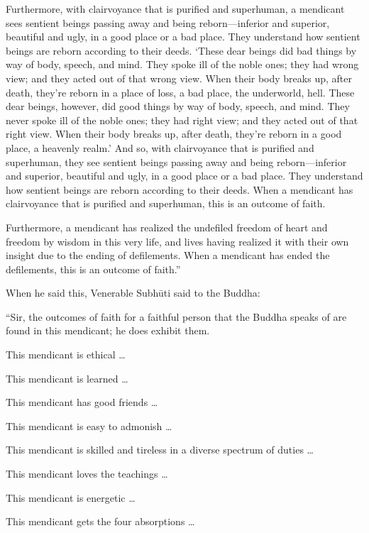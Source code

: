 \documentclass[12pt,openany]{book}%
\begin{document}
Furthermore, with clairvoyance that is purified and superhuman, a mendicant sees sentient beings passing away and being reborn—inferior and superior, beautiful and ugly, in a good place or a bad place. They understand how sentient beings are reborn according to their deeds. ‘These dear beings did bad things by way of body, speech, and mind. They spoke ill of the noble ones; they had wrong view; and they acted out of that wrong view. When their body breaks up, after death, they’re reborn in a place of loss, a bad place, the underworld, hell. These dear beings, however, did good things by way of body, speech, and mind. They never spoke ill of the noble ones; they had right view; and they acted out of that right view. When their body breaks up, after death, they’re reborn in a good place, a heavenly realm.’ And so, with clairvoyance that is purified and superhuman, they see sentient beings passing away and being reborn—inferior and superior, beautiful and ugly, in a good place or a bad place. They understand how sentient beings are reborn according to their deeds. When a mendicant has clairvoyance that is purified and superhuman, this is an outcome of faith. 

Furthermore, a mendicant has realized the undefiled freedom of heart and freedom by wisdom in this very life, and lives having realized it with their own insight due to the ending of defilements. When a mendicant has ended the defilements, this is an outcome of faith.” 

When he said this, Venerable \textsanskrit{Subhūti} said to the Buddha: 

“Sir, the outcomes of faith for a faithful person that the Buddha speaks of are found in this mendicant; he does exhibit them. 

This mendicant is ethical … 

This mendicant is learned … 

This mendicant has good friends … 

This mendicant is easy to admonish … 

This mendicant is skilled and tireless in a diverse spectrum of duties … 

This mendicant loves the teachings … 

This mendicant is energetic … 

This mendicant gets the four absorptions … 
\end{document}
